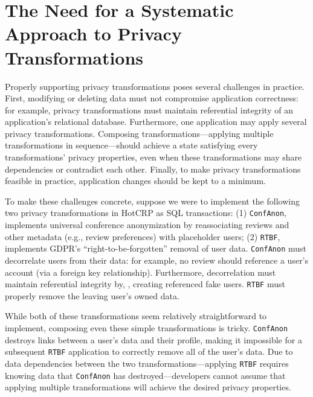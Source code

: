 \section{The Need for a Systematic Approach to Privacy Transformations}
Properly supporting privacy transformations poses several challenges in practice. First, modifying or
deleting data must not compromise application correctness: for example, privacy transformations must
maintain referential integrity of an application's relational database. 
%
Furthermore, one application may apply several privacy transformations. Composing
transformations---applying multiple transformations in sequence---should achieve a state satisfying
every transformations' privacy properties, even when these transformations may share dependencies or
contradict each other. 
%
Finally, to make privacy transformations feasible in practice, application changes should be kept to
a minimum. 
%

%
To make these challenges concrete, suppose we were to implement the following two privacy
transformations in HotCRP as SQL transactions: (1) \texttt{ConfAnon}, implements universal conference
anonymization by reassociating reviews and other metadata (e.g., review preferences) with
placeholder users; (2) \texttt{RTBF}, implements GDPR's ``right-to-be-forgotten'' removal of user data. 
\texttt{ConfAnon} must decorrelate users from their data: for example, no review should reference a
user's account (via a foreign key relationship). Furthermore, 
decorrelation must maintain referential integrity by, \eg, creating referenced fake users.
\texttt{RTBF} must properly remove the leaving user's owned data.

While both of these transformations seem relatively straightforward to implement, composing even
these simple transformations is tricky. \texttt{ConfAnon} destroys links between a user's data and
their profile, making it impossible for a subsequent \texttt{RTBF} application to correctly remove
all of the user's data. Due to data dependencies between the two transformations---applying
\texttt{RTBF} requires knowing data that \texttt{ConfAnon} has destroyed---developers cannot assume
that applying multiple transformations will achieve the desired privacy properties.
%


